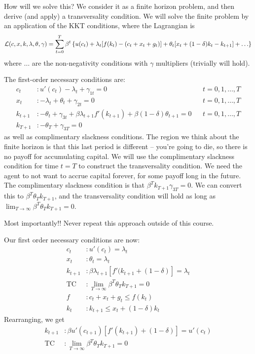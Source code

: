 \documentclass[10pt]{article}
\begin{document}
How will we solve this? We consider it as a finite horizon problem, and then derive (and apply) a transversality condition. We will solve the finite problem by an application of the KKT conditions, where the Lagrangian is
\[\mathcal{L}(c,x,k,\lambda,\theta,\gamma) = \sum_{t=0}^T \beta^t \curll u(c_t) + \lambda_t[f(k_t) - (c_t+x_t+g_t)] + \theta_t [x_t + (1-\delta)k_t-k_{t+1}] + \dots\curlr\]
where $\dots$ are the non-negativity conditions with $\gamma$ multipliers (trivially will hold).

The first-order necessary conditions are:
\begin{align*}
	c_t &: u'(c_t) - \lambda_t + \gamma_{1t} = 0 && t = 0,1,\dots,T \\
	x_t &: - \lambda_t +\theta_t +  \gamma_{2t} = 0 && t = 0,1,\dots,T \\
	k_{t+1} &: -\theta_t + \gamma_{3t} + \beta \lambda_{t+1}f'(k_{t+1}) + \beta(1-\delta)\theta_{t+1} = 0 && t = 0,1,\dots,T \\
	k_{T+1} &:-\theta_T + \gamma_{3T} = 0
\end{align*}
as well as complimentary slackness conditions. The region we think about the finite horizon is that this last period is different -- you're going to die, so there is no payoff for accumulating capital. We will use the complimentary slackness condition for time $t = T$ to construct the transversality condition. We need the agent to not want to accrue capital forever, for some payoff long in the future. The complimentary slackness condition is that $\beta^Tk_{T+1}\gamma_{3T} = 0$. We can convert this to $\beta^T \theta_T k_{T+1}$, and the transversality condition will hold as long as $\lim_{T\to\infty} \beta^T \theta_T k_{T+1} = 0$.

\begin{remark}
	Most importantly!! Never repeat this approach outside of this course. 
\end{remark}

Our first order necessary conditions are now:
\begin{align*}
	c_t &: u'(c_t) = \lambda_t \\ x_t &: \theta_t = \lambda_t \\ k_{t+1} &: \beta \lambda_{t+1}[f'(k_{t+1} + (1-\delta)] = \lambda_t \\\text{TC} &: \lim_{T\to\infty} \beta^T \theta_T k_{T+1} = 0 \\ f&: c_t + x_t + g_t \le f(k_t) \\ k_{t} &: k_{t+1} \le x_t + (1-\delta)k_t
\end{align*}
Rearranging, we get 
\begin{align*}
	k_{t+1} &: \beta u'(c_{t+1})[f'(k_{t+1}) + (1-\delta)] = u'(c_t) \\ \text{TC} &: \lim_{T\to\infty} \beta^T \theta_T k_{T+1} = 0
\end{align*}
\end{document}
